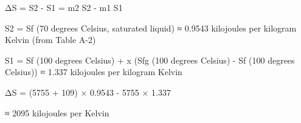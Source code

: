 ΔS = S2 - S1 = m2 S2 - m1 S1  

S2 = Sf (70 degrees Celsius, saturated liquid) ≈ 0.9543 kilojoules per kilogram Kelvin (from Table A-2)  

S1 = Sf (100 degrees Celsius) + x (Sfg (100 degrees Celsius) - Sf (100 degrees Celsius)) ≈ 1.337 kilojoules per kilogram Kelvin  

ΔS = (5755 + 109) × 0.9543 - 5755 × 1.337  

≈ 2095 kilojoules per Kelvin